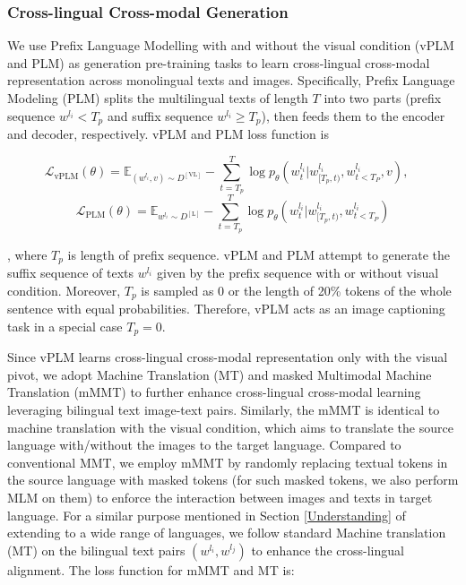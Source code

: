 \documentclass{article}
\begin{document}
\subsubsection{Cross-lingual Cross-modal Generation}
We use Prefix Language Modelling with and without the visual condition (vPLM and PLM) as generation pre-training tasks to learn cross-lingual cross-modal representation across monolingual texts and images. Specifically, Prefix Language Modeling (PLM) splits the multilingual texts of length $T$ into two parts (prefix sequence $w^{l_i} < T_{p}$ and suffix sequence $w^{l_i} \geq T_{p}$), then feeds them to the encoder and decoder, respectively. vPLM and PLM loss function is 

\begin{equation}
\mathcal{L}_{\mathrm{vPLM}}(\theta)=\mathbb{E}_{(w^{l_{i}},v)\sim D^{[\mathrm{VL}]}} -\sum_{t=T_{p}}^{T}\log{p_{\theta}(w^{l_{i}}_{t}|w_{[T_{p},t)}^{l_{i}},w_{t<T_{P}}^{l_i},v)}, \quad
\end{equation}
\begin{equation}
\mathcal{L}_{\mathrm{PLM}}(\theta)=\mathbb{E}_{w^{l_{i}}\sim D^{[\mathrm{L}]}} -\sum_{t=T_{p}}^{T}\log{p_{\theta}(w^{l_{i}}_{t}|w_{[T_{p},t)}^{l_{i}},w_{t<T_{P}}^{l_i})} 
\end{equation}

, where $T_{p}$ is length of prefix sequence. vPLM and PLM attempt to generate the suffix sequence of texts $w^{l_i}$ given by the prefix sequence with or without visual condition. Moreover, $T_p$ is sampled as 0 or the length of 20\% tokens of the whole sentence with equal probabilities. Therefore, vPLM acts as an image captioning task in a special case $T_p=0$.

Since vPLM learns cross-lingual cross-modal representation only with the visual pivot, we adopt Machine Translation (MT) and masked Multimodal Machine Translation (mMMT) to further enhance cross-lingual cross-modal learning leveraging bilingual text image-text pairs. Similarly, the mMMT is identical to machine translation with the visual condition, which aims to translate the source language with/without the images to the target language. Compared to conventional MMT, we employ mMMT by randomly replacing textual tokens in the source language with masked tokens (for such masked tokens, we also perform MLM on them) to enforce the interaction between images and texts in target language. For a similar purpose mentioned in Section \ref{Understanding} of extending to a wide range of languages, we follow standard Machine translation (MT) on the bilingual text pairs $(w^{l_{i}},w^{l_{j}})$ to enhance the cross-lingual alignment. The loss function for mMMT and MT is:
\end{document}
